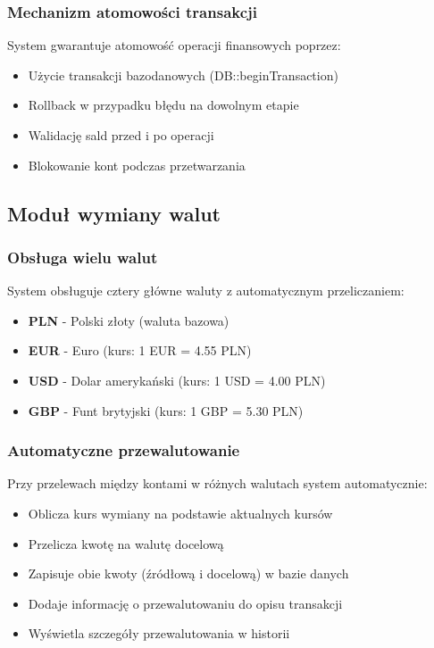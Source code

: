 \documentclass[12pt,a4paper]{article}
\begin{document}
    \subsubsection{Mechanizm atomowości transakcji}
    System gwarantuje atomowość operacji finansowych poprzez:
    \begin{itemize}
        \item Użycie transakcji bazodanowych (DB::beginTransaction)
        \item Rollback w przypadku błędu na dowolnym etapie
        \item Walidację sald przed i po operacji
        \item Blokowanie kont podczas przetwarzania
    \end{itemize}

    \subsection{Moduł wymiany walut}

    \subsubsection{Obsługa wielu walut}
    System obsługuje cztery główne waluty z automatycznym przeliczaniem:
    \begin{itemize}
        \item \textbf{PLN} - Polski złoty (waluta bazowa)
        \item \textbf{EUR} - Euro (kurs: 1 EUR = 4.55 PLN)
        \item \textbf{USD} - Dolar amerykański (kurs: 1 USD = 4.00 PLN)
        \item \textbf{GBP} - Funt brytyjski (kurs: 1 GBP = 5.30 PLN)
    \end{itemize}

    \subsubsection{Automatyczne przewalutowanie}
    Przy przelewach między kontami w różnych walutach system automatycznie:
    \begin{itemize}
        \item Oblicza kurs wymiany na podstawie aktualnych kursów
        \item Przelicza kwotę na walutę docelową
        \item Zapisuje obie kwoty (źródłową i docelową) w bazie danych
        \item Dodaje informację o przewalutowaniu do opisu transakcji
        \item Wyświetla szczegóły przewalutowania w historii
    \end{itemize}
\end{document}
